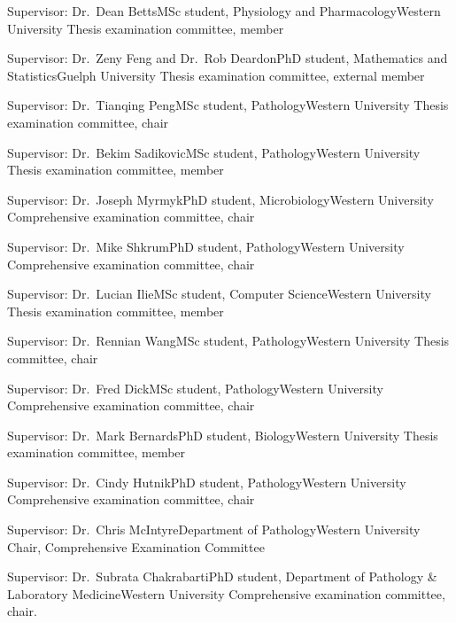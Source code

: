 {Supervisor: Dr.~Dean Betts}{MSc student, Physiology and Pharmacology}{Western University}
{Thesis examination committee, member}


{Supervisor: Dr.~Zeny Feng and Dr.~Rob Deardon}{PhD student, Mathematics and Statistics}{Guelph University}
{Thesis examination committee, external member}

{Supervisor: Dr.~Tianqing Peng}{MSc student, Pathology}{Western University}
{Thesis examination committee, chair}


{Supervisor: Dr.~Bekim Sadikovic}{MSc student, Pathology}{Western University}
{Thesis examination committee, member}


{Supervisor: Dr.~Joseph Myrmyk}{PhD student, Microbiology}{Western University}
{Comprehensive examination committee, chair}

{Supervisor: Dr.~Mike Shkrum}{PhD student, Pathology}{Western University}
{Comprehensive examination committee, chair}

{Supervisor: Dr.~Lucian Ilie}{MSc student, Computer Science}{Western University}
{Thesis examination committee, member}


{Supervisor: Dr.~Rennian Wang}{MSc student, Pathology}{Western University}
{Thesis committee, chair}

{Supervisor: Dr.~Fred Dick}{MSc student, Pathology}{Western University}
{Comprehensive examination committee, chair}

{Supervisor: Dr.~Mark Bernards}{PhD student, Biology}{Western University}
{Thesis examination committee, member}

{Supervisor: Dr.~Cindy Hutnik}{PhD student, Pathology}{Western University}
{Comprehensive examination committee, chair}



{Supervisor: Dr.~Chris McIntyre}{Department of Pathology}{Western University}
{Chair, Comprehensive Examination Committee}


{Supervisor: Dr.~Subrata Chakrabarti}{PhD student, Department of Pathology \& Laboratory Medicine}{Western University}
{Comprehensive examination committee, chair.}


